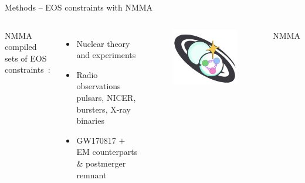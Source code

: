 \documentclass[usenames,dvipsnames,t]{beamer}
\begin{document}
\begin{frame}{Methods -- EOS constraints with \textsc{NMMA}}

\def\x{2mm}
\def\y{2mm}
\def\z{-2mm}

\vspace{\z}

\begin{columns}

  \textsc{NMMA} compiled sets of EOS constraints~\cite{Koehn:2024set}:
  \footnotesize
  \begin{itemize}

    \item Nuclear theory and experiments
    \item Radio observations pulsars, NICER, bursters, X-ray binaries
    \item GW170817 $+$ EM counterparts \& postmerger remnant

  \end{itemize}
  \normalsize


  \begin{figure}[t]
    \centering
    \includegraphics[width=\linewidth]{Figures/NMMA logo.jpg}
  \end{figure}

  \vspace{-3mm}
  \small \textsc{NMMA} \normalsize
  
\end{columns}


\end{frame}
\end{document}
